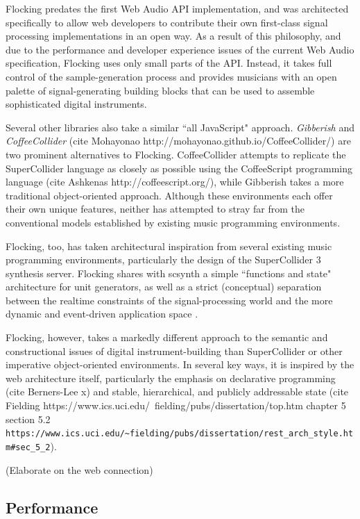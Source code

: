 \documentclass{article}
\begin{document}
Flocking predates the first Web Audio API implementation, and was architected specifically to allow web developers to contribute their own first-class signal processing implementations in an open way. As a result of this philosophy, and due to the performance and developer experience issues of the current Web Audio specification, Flocking uses only small parts of the API. Instead, it takes full control of the sample-generation process and provides musicians with an open palette of signal-generating building blocks that can be used to assemble sophisticated digital instruments.

Several other libraries also take a similar ``all JavaScript" approach. {\it Gibberish} \cite{roberts_web_2013} and {\it CoffeeCollider} (cite Mohayonao http://mohayonao.github.io/CoffeeCollider/) are two prominent alternatives to Flocking. CoffeeCollider attempts to replicate the SuperCollider language as closely as possible using the CoffeeScript programming language (cite Ashkenas http://coffeescript.org/), while Gibberish takes a more traditional object-oriented approach. Although these environments each offer their own unique features, neither has attempted to stray far from the conventional models established by existing music programming environments.

Flocking, too, has taken architectural inspiration from several existing music programming environments, particularly the design of the SuperCollider 3 synthesis server. Flocking shares with scsynth a simple ``functions and state" architecture for unit generators, as well as a strict (conceptual) separation between the realtime constraints of the signal-processing world and the more dynamic and event-driven application space \cite[pp. 64]{mccartney2002rethinking}.

Flocking, however, takes a markedly different approach to the semantic and constructional issues of digital instrument-building than SuperCollider or other imperative object-oriented environments. In several key ways, it is inspired by the web architecture itself, particularly the emphasis on declarative programming (cite Berners-Lee x) and stable, hierarchical, and publicly addressable state (cite Fielding https://www.ics.uci.edu/~fielding/pubs/dissertation/top.htm chapter 5 section 5.2 \verb|https://www.ics.uci.edu/~fielding/pubs/dissertation/rest_arch_style.htm#sec_5_2|).

(Elaborate on the web connection)

\subsection{Performance}
\end{document}
